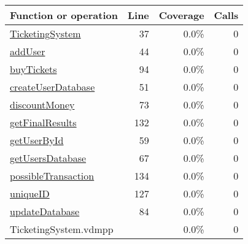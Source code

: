 \begin{longtable}{|l|r|r|r|}
\hline
Function or operation & Line & Coverage & Calls \\
\hline
\hline
\hyperref[TicketingSystem:37]{TicketingSystem} & 37&0.0\% & 0 \\
\hline
\hyperref[addUser:44]{addUser} & 44&0.0\% & 0 \\
\hline
\hyperref[buyTickets:94]{buyTickets} & 94&0.0\% & 0 \\
\hline
\hyperref[createUserDatabase:51]{createUserDatabase} & 51&0.0\% & 0 \\
\hline
\hyperref[discountMoney:73]{discountMoney} & 73&0.0\% & 0 \\
\hline
\hyperref[getFinalResults:132]{getFinalResults} & 132&0.0\% & 0 \\
\hline
\hyperref[getUserById:59]{getUserById} & 59&0.0\% & 0 \\
\hline
\hyperref[getUsersDatabase:67]{getUsersDatabase} & 67&0.0\% & 0 \\
\hline
\hyperref[possibleTransaction:134]{possibleTransaction} & 134&0.0\% & 0 \\
\hline
\hyperref[uniqueID:127]{uniqueID} & 127&0.0\% & 0 \\
\hline
\hyperref[updateDatabase:84]{updateDatabase} & 84&0.0\% & 0 \\
\hline
\hline
TicketingSystem.vdmpp & & 0.0\% & 0 \\
\hline
\end{longtable}

